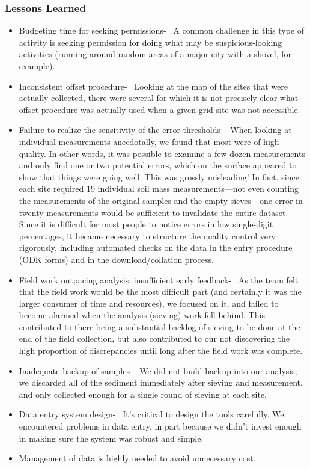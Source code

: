 \documentclass[a4paper,12pt,twoside]{article}
\begin{document}
\subsubsection{Lessons Learned}
\begin{itemize}
    \item {\color {RHblue}Budgeting time for seeking permissions-}
\
A common challenge in this type of activity is seeking permission for doing what may be suspicious-looking activities (running around random areas of a major city with a shovel, for example).
    \item {\color {RHblue}Inconsistent offset procedure-}
\
Looking at the map of the sites that were actually collected, there were several for which it is not precisely clear what offset procedure was actually used when a given grid site was not accessible.

    \item {\color {RHblue}Failure to realize the sensitivity of the error thresholds-}
\
When looking at individual measurements anecdotally, we found that most were of high quality. In other words, it was possible to examine a few dozen measurements and only find one or two potential errors, which on the surface appeared to show that things were going well. This was grossly misleading! In fact, since each site required 19 individual soil mass measurements---not even counting the measurements of the original samples and the empty sieves---one error in twenty measurements would be sufficient to invalidate the entire dataset. Since it is difficult for most people to notice errors in low single-digit percentages, it became necessary to structure the quality control very rigorously, including automated checks on the data in the entry procedure (ODK forms) and in the download/collation process. 

    \item {\color{RHblue} Field work outpacing analysis, insufficient early feedback-}
\
As the team felt that the field work would be the most difficult part (and certainly it was the larger consumer of time and resources), we focused on it, and failed to become alarmed when the analysis (sieving) work fell behind. This contributed to there being a substantial backlog of sieving to be done at the end of the field collection, but also contributed to our not discovering the high proportion of discrepancies until long after the field work was complete.

    \item {\color{RHblue}Inadequate backup of samples-}
\
We did not build backup into our analysis; we discarded all of the sediment immediately after sieving and measurement, and only collected enough for a single round of sieving at each site.

    \item {\color{RHblue}Data entry system design-}
\
It’s critical to design the tools carefully. We encountered problems in data entry, in part because we didn’t invest enough in making sure the system was robust and simple.

    \item Management of data is highly needed to avoid unnecessary cost.
\end{itemize}
\end{document}
